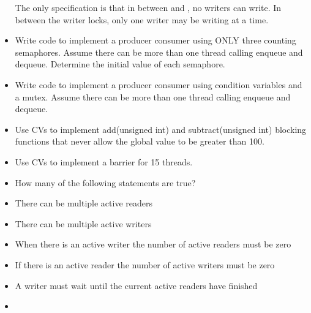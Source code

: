 \begin{itemize}
  The only specification is that in between  and , no writers can write. In between the writer locks, only one writer may be writing at a time.
\item
  Write code to implement a producer consumer using ONLY three counting semaphores. Assume there can be more than one thread calling enqueue and dequeue. Determine the initial value of each semaphore.
\item
  Write code to implement a producer consumer using condition variables and a mutex. Assume there can be more than one thread calling enqueue and dequeue.
\item
  Use CVs to implement add(unsigned int) and subtract(unsigned int) blocking functions that never allow the global value to be greater than 100.
\item
  Use CVs to implement a barrier for 15 threads.
\item
  How many of the following statements are true?
\item
There can be multiple active readers
\item
There can be multiple active writers
\item
When there is an active writer the number of active readers must be zero
\item
If there is an active reader the number of active writers must be zero
\item
A writer must wait until the current active readers have finished
\item
\end{itemize}



